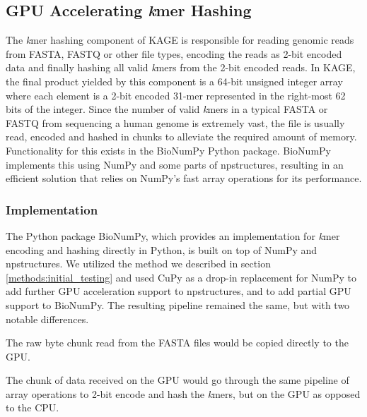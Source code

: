 \subsection{GPU Accelerating \textit{k}mer Hashing} \label{methods:gpu_accelerating_kmer_hashing}
The \textit{k}mer hashing component of KAGE is responsible for reading genomic reads from FASTA, FASTQ or other file types, encoding the reads as 2-bit encoded data and finally hashing all valid \textit{k}mers from the 2-bit encoded reads.
In KAGE, the final product yielded by this component is a 64-bit unsigned integer array where each element is a 2-bit encoded 31-mer represented in the right-most 62 bits of the integer.
Since the number of valid \textit{k}mers in a typical FASTA or FASTQ from sequencing a human genome is extremely vast, the file is usually read, encoded and hashed in chunks to alleviate the required amount of memory.
Functionality for this exists in the BioNumPy Python package.
BioNumPy implements this using NumPy and some parts of npstructures, resulting in an efficient solution that relies on NumPy's fast array operations for its performance.

\subsubsection{Implementation}
The Python package BioNumPy, which provides an implementation for \textit{k}mer encoding and hashing directly in Python, is built on top of NumPy and npstructures.
We utilized the method we described in section \ref{methods:initial_testing} and used CuPy as a drop-in replacement for NumPy to add further GPU acceleration support to npstructures, and to add partial GPU support to BioNumPy.
The resulting pipeline remained the same, but with two notable differences.
\begin{compactenum}
  \item The raw byte chunk read from the FASTA files would be copied directly to the GPU.
  \item The chunk of data received on the GPU would go through the same pipeline of array operations to 2-bit encode and hash the \textit{k}mers, but on the GPU as opposed to the CPU.
\end{compactenum}


